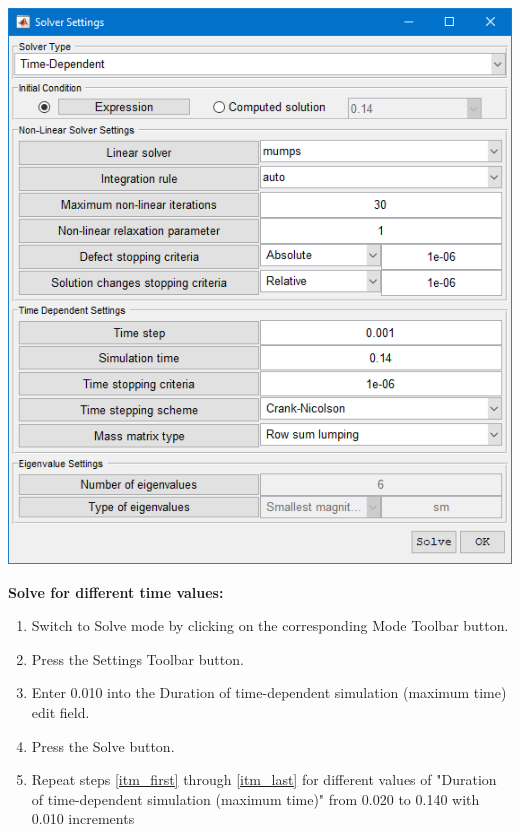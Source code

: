 \documentclass{article}
\begin{document}
\begin{center}
\includegraphics[scale=0.60]{./matlab/FEATool_steps/solverSettings.png}
\end{center}

\textbf{Solve for different time values:}
\begin{enumerate}[resume]
\item \label{itm_first} Switch to Solve mode by clicking on the corresponding Mode Toolbar button.
\item Press the Settings Toolbar button.
\item Enter  0.010  into the Duration of time-dependent simulation (maximum time) edit field.
\item \label{itm_last} Press the Solve button.
\item[] Repeat steps \ref{itm_first} through \ref{itm_last} for different values of "Duration of time-dependent simulation (maximum time)" from 0.020 to 0.140 with 0.010 increments
\end{enumerate}
\end{document}
